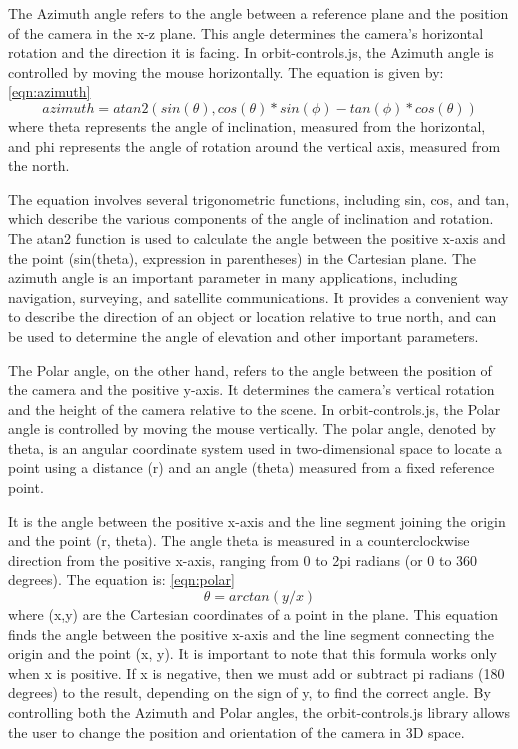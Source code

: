 The Azimuth angle refers to the angle between a reference plane and the position of the camera in 
the x-z plane. This angle determines the camera's horizontal rotation and the direction it is facing. 
In orbit-controls.js, the Azimuth angle is controlled by moving the mouse horizontally.
The equation is given by: \ref{eqn:azimuth}
\begin{equation}
  \label{eqn:azimuth}
	azimuth = atan2(sin(\theta), cos(\theta)*sin(\phi) - tan(\phi)*cos(\theta))
\end{equation}
where theta represents the angle of inclination, measured from the horizontal, and phi represents the angle 
of rotation around the vertical axis, measured from the north.

The equation involves several trigonometric functions, including sin, cos, and tan, which describe the various 
components of the angle of inclination and rotation. The atan2 function is used to calculate the angle between 
the positive x-axis and the point (sin(theta), expression in parentheses) in the Cartesian plane.
The azimuth angle is an important parameter in many applications, including navigation, surveying, and satellite communications. 
It provides a convenient way to describe the direction of an object or location relative to true north, 
and can be used to determine the angle of elevation and other important parameters.

The Polar angle, on the other hand, refers to the angle between the position of the camera and the 
positive y-axis. It determines the camera's vertical rotation and the height of the camera relative 
to the scene. In orbit-controls.js, the Polar angle is controlled by moving the mouse vertically.
The polar angle, denoted by theta, is an angular coordinate system used in two-dimensional space to locate 
a point using a distance (r) and an angle (theta) measured from a fixed reference point.

It is the angle between the positive x-axis and the line segment 
joining the origin and the point (r, theta). The angle theta is measured in a counterclockwise direction 
from the positive x-axis, ranging from 0 to 2pi radians (or 0 to 360 degrees). The equation is: \ref{eqn:polar}
\begin{equation}
  \label{eqn:polar}
  \theta = arctan(y/x)
\end{equation}
where (x,y) are the Cartesian coordinates of a point in the plane. This equation finds the angle between the positive x-axis 
and the line segment connecting the origin and the point (x, y).
It is important to note that this formula works only when x is positive. If x is negative, 
then we must add or subtract pi radians (180 degrees) to the result, depending on the sign of y, to find the correct angle.
By controlling both the Azimuth and Polar angles, the orbit-controls.js library allows the user to 
change the position and orientation of the camera in 3D space. 

